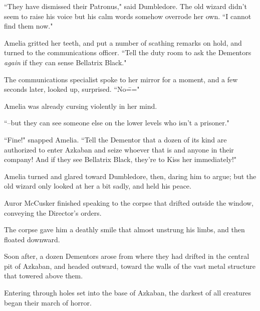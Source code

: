 ``They have dismissed their Patronus," said Dumbledore. The old wizard didn't seem to raise his voice but his calm words somehow overrode her own. ``I cannot find them now."

Amelia gritted her teeth, and put a number of scathing remarks on hold, and turned to the communications officer. ``Tell the duty room to ask the Dementors \emph{again} if they can sense Bellatrix Black."

The communications specialist spoke to her mirror for a moment, and a few seconds later, looked up, surprised. ``No\==="

Amelia was already cursing violently in her mind.

``\---but they can see someone else on the lower levels who isn't a prisoner."

``Fine!" snapped Amelia. ``Tell the Dementor that a dozen of its kind are authorized to enter Azkaban and seize whoever that is and anyone in their company! And if they see Bellatrix Black, they're to Kiss her immediately!"

Amelia turned and glared toward Dumbledore, then, daring him to argue; but the old wizard only looked at her a bit sadly, and held his peace.

\later

Auror McCusker finished speaking to the corpse that drifted outside the window, conveying the Director's orders.

The corpse gave him a deathly smile that almost unstrung his limbs, and then floated downward.

Soon after, a dozen Dementors arose from where they had drifted in the central pit of Azkaban, and headed outward, toward the walls of the vast metal structure that towered above them.

Entering through holes set into the base of Azkaban, the darkest of all creatures began their march of horror.


